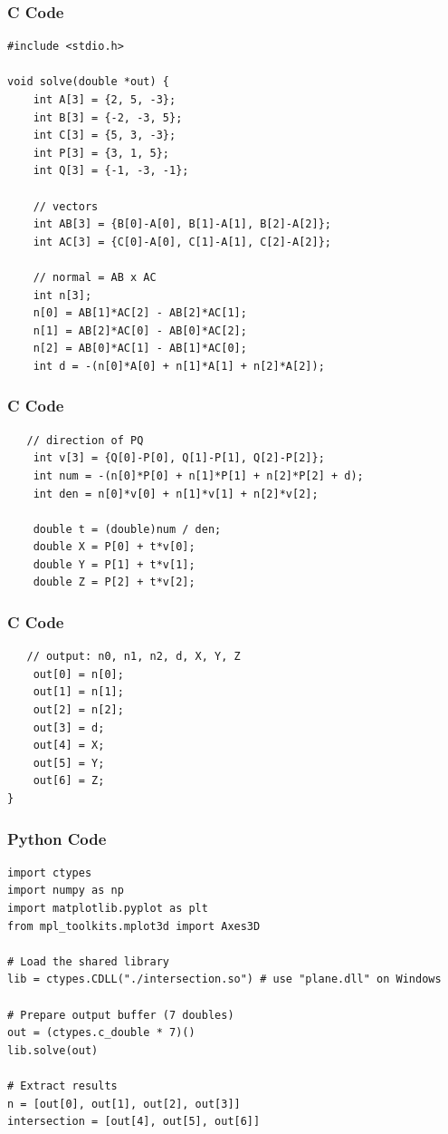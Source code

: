 \documentclass{beamer}
\begin{document}
\begin{frame}[fragile]
    \frametitle{C Code}
    \begin{lstlisting}
#include <stdio.h>

void solve(double *out) {
    int A[3] = {2, 5, -3};
    int B[3] = {-2, -3, 5};
    int C[3] = {5, 3, -3};
    int P[3] = {3, 1, 5};
    int Q[3] = {-1, -3, -1};

    // vectors
    int AB[3] = {B[0]-A[0], B[1]-A[1], B[2]-A[2]};
    int AC[3] = {C[0]-A[0], C[1]-A[1], C[2]-A[2]};

    // normal = AB x AC
    int n[3];
    n[0] = AB[1]*AC[2] - AB[2]*AC[1];
    n[1] = AB[2]*AC[0] - AB[0]*AC[2];
    n[2] = AB[0]*AC[1] - AB[1]*AC[0];
    int d = -(n[0]*A[0] + n[1]*A[1] + n[2]*A[2]);
    \end{lstlisting}
\end{frame}

\begin{frame}[fragile]
    \frametitle{C Code}
    \begin{lstlisting}
   // direction of PQ
    int v[3] = {Q[0]-P[0], Q[1]-P[1], Q[2]-P[2]};
    int num = -(n[0]*P[0] + n[1]*P[1] + n[2]*P[2] + d);
    int den = n[0]*v[0] + n[1]*v[1] + n[2]*v[2];

    double t = (double)num / den;
    double X = P[0] + t*v[0];
    double Y = P[1] + t*v[1];
    double Z = P[2] + t*v[2];
    \end{lstlisting}
\end{frame}

\begin{frame}[fragile]
    \frametitle{C Code}
    \begin{lstlisting}
   // output: n0, n1, n2, d, X, Y, Z
    out[0] = n[0];
    out[1] = n[1];
    out[2] = n[2];
    out[3] = d;
    out[4] = X;
    out[5] = Y;
    out[6] = Z;
}
    \end{lstlisting}
\end{frame}

\begin{frame}[fragile]
    \frametitle{Python Code}
    \begin{lstlisting}
import ctypes
import numpy as np
import matplotlib.pyplot as plt
from mpl_toolkits.mplot3d import Axes3D

# Load the shared library
lib = ctypes.CDLL("./intersection.so") # use "plane.dll" on Windows

# Prepare output buffer (7 doubles)
out = (ctypes.c_double * 7)()
lib.solve(out)

# Extract results
n = [out[0], out[1], out[2], out[3]]
intersection = [out[4], out[5], out[6]]
    \end{lstlisting}
\end{frame}
\end{document}

